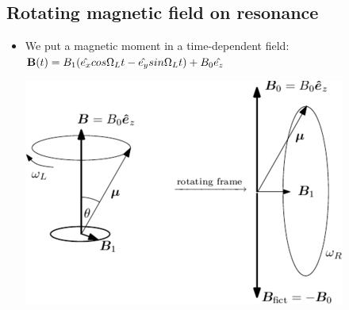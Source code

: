 \documentclass[AtomicOptical1Notes.tex]{subfiles}
\begin{document}
	\subsection{Rotating magnetic field on resonance}
		\begin{itemize}
			\item We put a magnetic moment in a time-dependent field: $ \mathbf{B}(t) = B_1(\hat{e_x}cos\Omega_L t - \hat{e_y}sin\Omega_L t) + B_0\hat{e_z} $
			
			\includegraphics{rotatingBfield}
			

\end{itemize}
\end{document}

